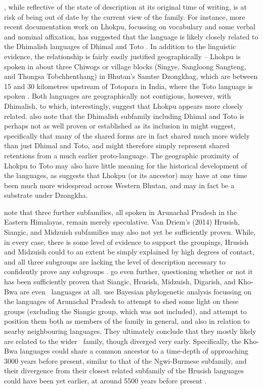 , while reflective of the state of description at its original time of writing, is at risk of being out of date by the current view of the family. For instance, more recent documentation work on Lhokpu, focussing on vocabulary and some verbal and nominal affixation, has suggested that the language is likely closely related to the Dhimalish languages of Dhimal and Toto \cite{Grollmann2018}. In addition to the linguistic evidence, the relationship is fairly easily justified geographically -- Lhokpu is spoken in about three Chiwogs or village blocks (Singye, Sangloong Sangteng, and Thongsa Tobchhenthang) in Bhutan's Samtse Dzongkhag, which are between 15 and 30 kilometres upstream of Totopara in India, where the Toto language is spoken \cite{Basumatary2016}. Both languages are geographically not contigious, however, with Dhimalish, to which, interestingly,  suggest that Lhokpu appears more closely related.  also note that the Dhimalish subfamily including Dhimal and Toto is perhaps not as well proven or established as its inclusion in  might suggest, specifically that many of the shared forms are in fact shared much more widely than just Dhimal and Toto, and might therefore simply represent shared retentions from a much earlier proto-language. The geographic proximity of Lhokpu to Toto may also have little meaning for the historical development of the languages, as  suggests that Lhokpu (or its ancestor) may have at one time been much more widespread across Western Bhutan, and may in fact be a substrate under Dzongkha.

 note that three further subfamilies, all spoken in Arunachal Pradesh in the Eastern Himalayas, remain merely speculative. Van Driem's (2014) Hrusish, Siangic, and Midzuish subfamilies may also not yet be sufficiently proven. While, in every case, there is some level of evidence to support the groupings, Hrusish and Midzuish could to an extent be simply explained by high degrees of contact, and all three subgroups are lacking the level of description necessary to confidently prove any subgroups \cite{Post2017}.  go even further, questioning whether or not it has been sufficiently proven that Siangic, Hrusish, Midzuish, Digarish, and Kho-Bwa are even \lfam\ languages at all.  use Bayesian phylogenetic analysis focussing on the languages of Arunachal Pradesh to attempt to shed some light on these groups (excluding the Siangic group, which was not included), and attempt to position them both as members of the family in general, and also in relation to nearby neighbouring languages. They ultimately conclude that they mostly likely are related to the wider \lfam\ family, though diverged very early. Specifically, the Kho-Bwa languages could share a common ancestor to a time-depth of approaching 3000 years before present, similar to that of the Ngwi-Burmese subfamily, and their divergence from their closest related subfamily of the Hrusish languages could have been yet earlier, at around 5500 years before present \cite{Wu2022}.

